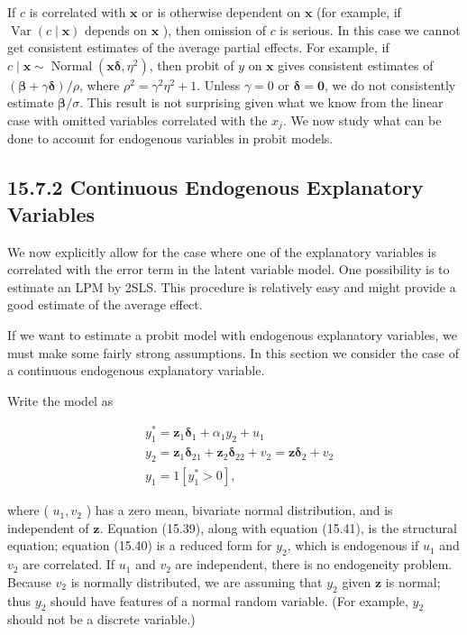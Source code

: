 \documentclass[10pt]{article}
\begin{document}
If $c$ is correlated with $\mathbf{x}$ or is otherwise dependent on $\mathbf{x}$ (for example, if $\operatorname{Var}(c \mid \mathbf{x})$ depends on $\mathbf{x}$ ), then omission of $c$ is serious. In this case we cannot get consistent estimates of the average partial effects. For example, if $c \mid \mathbf{x} \sim \operatorname{Normal}\left(\mathbf{x} \boldsymbol{\delta}, \eta^{2}\right)$, then probit of $y$ on $\mathbf{x}$ gives consistent estimates of $(\boldsymbol{\beta}+\gamma \boldsymbol{\delta}) / \rho$, where $\rho^{2}=\gamma^{2} \eta^{2}+1$. Unless $\gamma=0$ or $\boldsymbol{\delta}=\mathbf{0}$, we do not consistently estimate $\boldsymbol{\beta} / \sigma$. This result is not surprising given what we know from the linear case with omitted variables correlated with the $x_{j}$. We now study what can be done to account for endogenous variables in probit models.

\subsection*{15.7.2 Continuous Endogenous Explanatory Variables}
We now explicitly allow for the case where one of the explanatory variables is correlated with the error term in the latent variable model. One possibility is to estimate an LPM by 2SLS. This procedure is relatively easy and might provide a good estimate of the average effect.

If we want to estimate a probit model with endogenous explanatory variables, we must make some fairly strong assumptions. In this section we consider the case of a continuous endogenous explanatory variable.

Write the model as


\begin{align*}
& y_{1}^{*}=\mathbf{z}_{1} \boldsymbol{\delta}_{1}+\alpha_{1} y_{2}+u_{1}  \tag{15.39}\\
& y_{2}=\mathbf{z}_{1} \boldsymbol{\delta}_{21}+\mathbf{z}_{2} \boldsymbol{\delta}_{22}+v_{2}=\mathbf{z} \boldsymbol{\delta}_{2}+v_{2}  \tag{15.40}\\
& y_{1}=1\left[y_{1}^{*}>0\right], \tag{15.41}
\end{align*}


where ( $u_{1}, v_{2}$ ) has a zero mean, bivariate normal distribution, and is independent of $\mathbf{z}$. Equation (15.39), along with equation (15.41), is the structural equation; equation (15.40) is a reduced form for $y_{2}$, which is endogenous if $u_{1}$ and $v_{2}$ are correlated. If $u_{1}$ and $v_{2}$ are independent, there is no endogeneity problem. Because $v_{2}$ is normally distributed, we are assuming that $y_{2}$ given $\mathbf{z}$ is normal; thus $y_{2}$ should have features of a normal random variable. (For example, $y_{2}$ should not be a discrete variable.)
\end{document}
